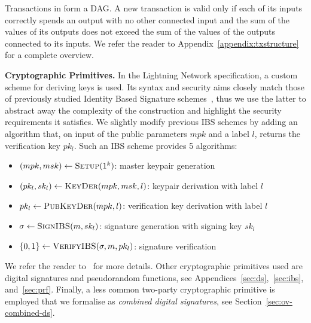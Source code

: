     Transactions in \ledger{} form a DAG. A new transaction is valid only if
    each of its inputs correctly spends an output with no other connected input
    and the sum of the values of its outputs does not exceed the sum of the
    values of the outputs connected to its inputs. We refer the reader to
    Appendix~\ref{appendix:txstructure} for a complete overview.

  \noindent \textbf{Cryptographic Primitives.}
    In the Lightning Network specification, a custom scheme for deriving keys is
    used. Its syntax and security aims closely match those of previously studied
    Identity Based Signature schemes~\cite{ibsshamir,ibspaterson}, thus we use
    the latter to abstract away the complexity of the construction and highlight
    the security requirements it satisfies. We slightly modify previous IBS
    schemes by adding an algorithm that, on input of the public parameters $mpk$
    and a label $l$, returns the verification key $pk_l$. Such an IBS scheme
    provides 5 algorithms:
    \begin{itemize}
      \item $(mpk, msk) \leftarrow \textsc{Setup}(1^k)$: master keypair
      generation
      \item $(pk_l, sk_l) \leftarrow \textsc{KeyDer}(mpk, msk, l)$: keypair
      derivation with label $l$
      \item $pk_l \leftarrow \textsc{PubKeyDer}(mpk, l)$: verification key
      derivation with label $l$
      \item $\sigma \leftarrow \textsc{SignIBS}(m, sk_l)$: signature generation
      with signing key $sk_l$
      \item $\{0, 1\} \leftarrow \textsc{VerifyIBS}(\sigma, m, pk_l)$: signature
      verification
    \end{itemize}
    We refer the reader to~\cite{ibspaterson} for more details. Other
    cryptographic primitives used are digital signatures and pseudorandom
    functions, see Appendices~\ref{sec:ds},~\ref{sec:ibs}, and~\ref{sec:prf}.
    Finally, a less common  two-party cryptographic primitive is employed that
    we formalise as {\em  combined digital signatures}, see
    Section~\ref{sec:ov-combined-ds}.
